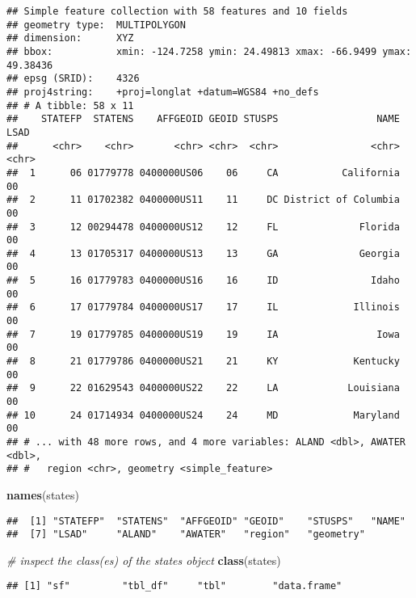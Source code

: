 \documentclass[]{book}
\newenvironment{Shaded}{\begin{snugshade}}{\end{snugshade}}
\newcommand{\KeywordTok}[1]{\textcolor[rgb]{0.13,0.29,0.53}{\textbf{{#1}}}}
\newcommand{\CommentTok}[1]{\textcolor[rgb]{0.56,0.35,0.01}{\textit{{#1}}}}
\newcommand{\NormalTok}[1]{{#1}}
\begin{document}
\begin{verbatim}
## Simple feature collection with 58 features and 10 fields
## geometry type:  MULTIPOLYGON
## dimension:      XYZ
## bbox:           xmin: -124.7258 ymin: 24.49813 xmax: -66.9499 ymax: 49.38436
## epsg (SRID):    4326
## proj4string:    +proj=longlat +datum=WGS84 +no_defs
## # A tibble: 58 x 11
##    STATEFP  STATENS    AFFGEOID GEOID STUSPS                 NAME  LSAD
##      <chr>    <chr>       <chr> <chr>  <chr>                <chr> <chr>
##  1      06 01779778 0400000US06    06     CA           California    00
##  2      11 01702382 0400000US11    11     DC District of Columbia    00
##  3      12 00294478 0400000US12    12     FL              Florida    00
##  4      13 01705317 0400000US13    13     GA              Georgia    00
##  5      16 01779783 0400000US16    16     ID                Idaho    00
##  6      17 01779784 0400000US17    17     IL             Illinois    00
##  7      19 01779785 0400000US19    19     IA                 Iowa    00
##  8      21 01779786 0400000US21    21     KY             Kentucky    00
##  9      22 01629543 0400000US22    22     LA            Louisiana    00
## 10      24 01714934 0400000US24    24     MD             Maryland    00
## # ... with 48 more rows, and 4 more variables: ALAND <dbl>, AWATER <dbl>,
## #   region <chr>, geometry <simple_feature>
\end{verbatim}

\begin{Shaded}
\begin{Highlighting}[]
\KeywordTok{names}\NormalTok{(states)}
\end{Highlighting}
\end{Shaded}

\begin{verbatim}
##  [1] "STATEFP"  "STATENS"  "AFFGEOID" "GEOID"    "STUSPS"   "NAME"    
##  [7] "LSAD"     "ALAND"    "AWATER"   "region"   "geometry"
\end{verbatim}

\begin{Shaded}
\begin{Highlighting}[]
\CommentTok{# inspect the class(es) of the states object}
\KeywordTok{class}\NormalTok{(states)}
\end{Highlighting}
\end{Shaded}

\begin{verbatim}
## [1] "sf"         "tbl_df"     "tbl"        "data.frame"
\end{verbatim}
\end{document}
